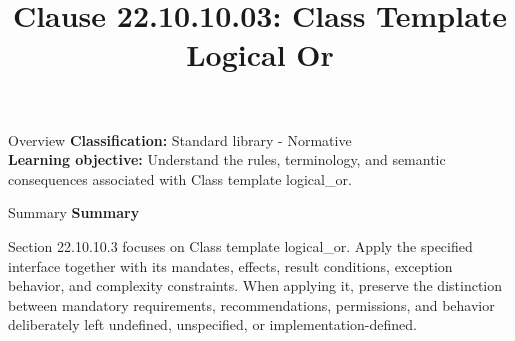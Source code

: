 \documentclass[10pt,letterpaper]{article}
\title{Clause 22.10.10.03: Class Template Logical Or}
\author{}
\date{}
\begin{document}
\maketitle
\begin{CornellOverviewBox}{Overview}
\textbf{Classification:} Standard library - Normative\\[2pt]
\textbf{Learning objective:} Understand the rules, terminology, and semantic consequences associated with Class template logical\_or.
\end{CornellOverviewBox}\begin{CornellSummaryBox}{Summary}
{\sffamily\bfseries\color{Accent} Summary}\par\vspace{3pt}Section 22.10.10.3 focuses on Class template logical\_or. Apply the specified interface together with its mandates, effects, result conditions, exception behavior, and complexity constraints. When applying it, preserve the distinction between mandatory requirements, recommendations, permissions, and behavior deliberately left undefined, unspecified, or implementation-defined.
\end{CornellSummaryBox}
\end{document}
